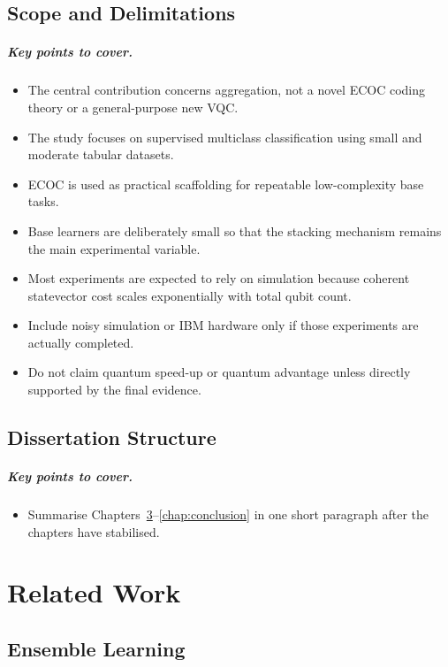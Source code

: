 \documentclass[]{UCD_CS_MSc_AAI_Report}
\newcommand{\sectionbrief}{\paragraph{Key points to cover.}}
\begin{document}
\section{Scope and Delimitations}
\label{sec:intro-scope}

\sectionbrief
\begin{itemize}
    \item The central contribution concerns aggregation, not a novel ECOC coding theory or a general-purpose new VQC.
    \item The study focuses on supervised multiclass classification using small and moderate tabular datasets.
    \item ECOC is used as practical scaffolding for repeatable low-complexity base tasks.
    \item Base learners are deliberately small so that the stacking mechanism remains the main experimental variable.
    \item Most experiments are expected to rely on simulation because coherent statevector cost scales exponentially with total qubit count.
    \item Include noisy simulation or IBM hardware only if those experiments are actually completed.
    \item Do not claim quantum speed-up or quantum advantage unless directly supported by the final evidence.
\end{itemize}

\section{Dissertation Structure}
\label{sec:intro-structure}

\sectionbrief
\begin{itemize}
    \item Summarise Chapters~\ref{chap:related-work}--\ref{chap:conclusion} in one short paragraph after the chapters have stabilised.
\end{itemize}

\chapter{Related Work}
\label{chap:related-work}

\section{Ensemble Learning}
\label{sec:rw-ensembles}
\end{document}
